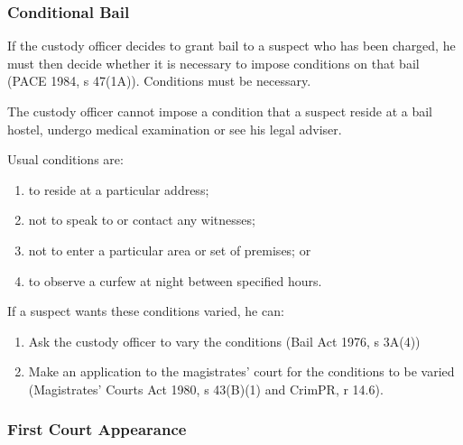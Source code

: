 \documentclass[
]{article}
\providecommand{\tightlist}{%
  \setlength{\itemsep}{0pt}\setlength{\parskip}{0pt}}
\begin{document}
\hypertarget{conditional-bail}{%
\subsubsection{Conditional Bail}\label{conditional-bail}}

If the custody officer decides to grant bail to a suspect who has been
charged, he must then decide whether it is necessary to impose
conditions on that bail (PACE 1984, s 47(1A)). Conditions must be
necessary.

The custody officer cannot impose a condition that a suspect reside at a
bail hostel, undergo medical examination or see his legal adviser.

Usual conditions are:

\begin{enumerate}
\def\labelenumi{\arabic{enumi}.}
\tightlist
\item
  to reside at a particular address;
\item
  not to speak to or contact any witnesses;
\item
  not to enter a particular area or set of premises; or
\item
  to observe a curfew at night between specified hours.
\end{enumerate}

If a suspect wants these conditions varied, he can:

\begin{enumerate}
\def\labelenumi{\arabic{enumi}.}
\tightlist
\item
  Ask the custody officer to vary the conditions (Bail Act 1976, s
  3A(4))
\item
  Make an application to the magistrates' court for the conditions to be
  varied (Magistrates' Courts Act 1980, s 43(B)(1) and CrimPR, r 14.6).
\end{enumerate}

\hypertarget{first-court-appearance}{%
\subsubsection{First Court Appearance}\label{first-court-appearance}}
\end{document}
